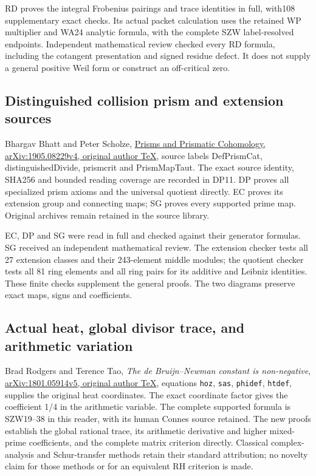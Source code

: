 \documentclass[
  10pt,
  a4paper,
]{article}
\begin{document}
RD proves the integral Frobenius pairings and trace identities in full,
with108 supplementary exact checks. Its actual packet calculation uses
the retained WP multiplier and WA24 analytic formula, with the complete
SZW label-resolved endpoints. Independent mathematical review checked
every RD formula, including the cotangent presentation and signed
residue defect. It does not supply a general positive Weil form or
construct an off-critical zero.

\subsection{Distinguished collision prism and extension
sources}\label{distinguished-collision-prism-and-extension-sources}

Bhargav Bhatt and Peter Scholze,
\href{https://arxiv.org/src/1905.08229v4}{Prisms and Prismatic
Cohomology, arXiv:1905.08229v4, original author TeX}, source labels
DefPrismCat, distinguishedDivide, prismcrit and PrismMapTaut. The exact
source identity, SHA256 and bounded reading coverage are recorded in
DP11. DP proves all specialized prism axioms and the universal quotient
directly. EC proves its extension group and connecting maps; SG proves
every supported prime map. Original archives remain retained in the
source library.

EC, DP and SG were read in full and checked against their generator
formulas. SG received an independent mathematical review. The extension
checker tests all 27 extension classes and their 243-element middle
modules; the quotient checker tests all 81 ring elements and all ring
pairs for its additive and Leibniz identities. These finite checks
supplement the general proofs. The two diagrams preserve exact maps,
signs and coefficients.

\subsection{Actual heat, global divisor trace, and arithmetic
variation}\label{actual-heat-global-divisor-trace-and-arithmetic-variation}

Brad Rodgers and Terence Tao, \emph{The de Bruijn--Newman constant is
non-negative},
\href{https://arxiv.org/src/1801.05914v5}{arXiv:1801.05914v5, original
author TeX}, equations \texttt{hoz}, \texttt{sas}, \texttt{phidef},
\texttt{htdef}, supplies the original heat coordinates. The exact
coordinate factor gives the coefficient 1/4 in the arithmetic variable.
The complete supported formula is SZW19--38 in this reader, with its
human Connes source retained. The new proofs establish the global
rational trace, its arithmetic derivative and higher mixed-prime
coefficients, and the complete matrix criterion directly. Classical
complex-analysis and Schur-transfer methods retain their standard
attribution; no novelty claim for those methods or for an equivalent RH
criterion is made.
\end{document}

